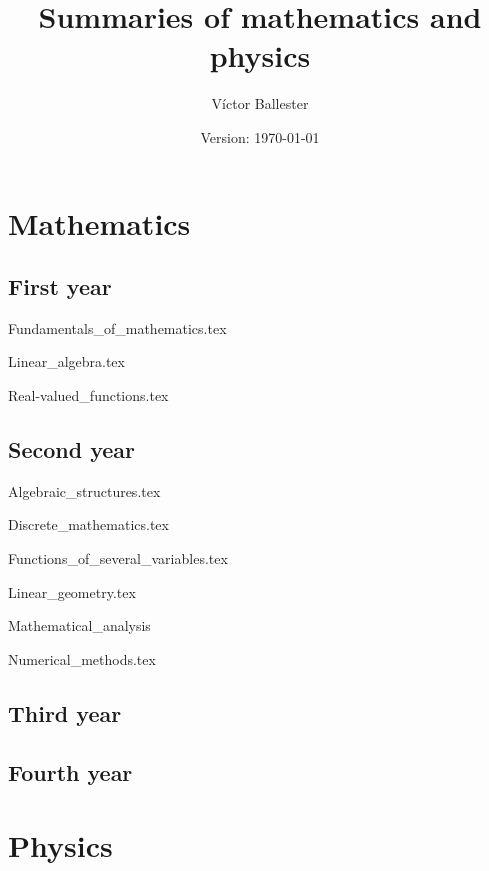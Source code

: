 \documentclass{report}
\title{Summaries of mathematics and physics}
\author{Víctor Ballester}
\date{Version: \today}
\begin{document}
\maketitle
\newpage
\tableofcontents
\newpage
\part{Mathematics}
    \chapter{First year}
        {Fundamentals_of_mathematics.tex}
        \cleardoublepage    
    
        {Linear_algebra.tex}
        \cleardoublepage
        
        {Real-valued_functions.tex}
        \cleardoublepage
    \chapter{Second year}
        {Algebraic_structures.tex}
        \cleardoublepage
        
        {Discrete_mathematics.tex}
        \cleardoublepage
        
        {Functions_of_several_variables.tex}
        \cleardoublepage
        
        {Linear_geometry.tex}
        \cleardoublepage
        
        {Mathematical_analysis}
        \cleardoublepage
        
        {Numerical_methods.tex}
        \cleardoublepage
    \chapter{Third year}
    \chapter{Fourth year}
\part{Physics}
\end{document}
